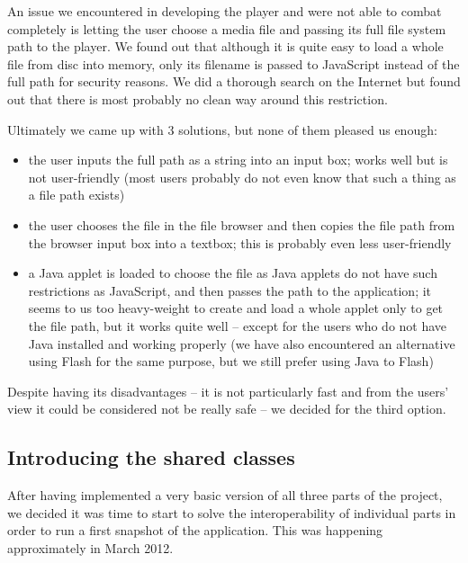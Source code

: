An issue we encountered in developing the player and were not able to combat completely is letting the user choose a media file and passing its full file system path to the player. We found out that although it is quite easy to load a whole file from disc into memory, only its filename is passed to JavaScript instead of the full path for security reasons. We did a thorough search on the Internet but found out that there is most probably no clean way around this restriction.

Ultimately we came up with 3 solutions, but none of them pleased us enough:

\begin{itemize}
\item the user inputs the full path as a string into an input box; works well but is not user-friendly (most users probably do not even know that such a thing as a file path exists)

\item the user chooses the file in the file browser and then copies the file path from the browser input box into a textbox; this is probably even less user-friendly

\item a Java applet is loaded to choose the file as Java applets do not have such restrictions as JavaScript, and then passes the path to the application; it seems to us too heavy-weight to create and load a whole applet only to get the file path, but it works quite well -- except for the users who do not have Java installed and working properly (we have also encountered an alternative using Flash for the same purpose, but we still prefer using Java to Flash)
\end{itemize}

Despite having its disadvantages -- it is not particularly fast and from the users' view it could be considered not be really safe -- we decided for the third option.

\subsection{Introducing the shared classes}
\label{subsec:introducing_shared_classes}

After having implemented a very basic version of all three parts of the project, we decided it was time to start to solve the interoperability of individual parts in order to run a first snapshot of the application. This was happening approximately in March 2012.


